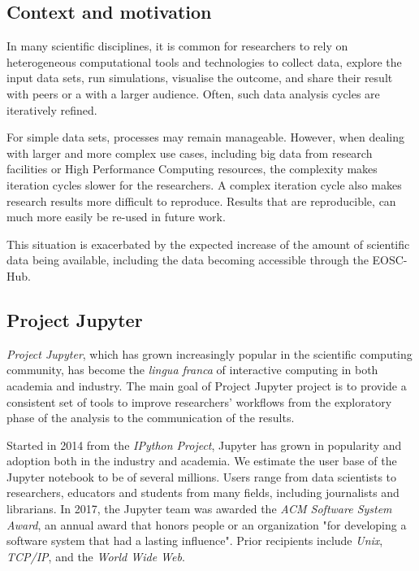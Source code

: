 \subsection{Context and motivation}

In many scientific disciplines, it is common for researchers to rely on
heterogeneous computational tools and technologies to collect data,
explore the input data sets, run simulations, visualise the outcome,
and share their result with peers or a with a larger audience. Often,
such data analysis cycles are iteratively refined.

For simple data sets, processes may remain manageable. However, when
dealing with larger and more complex use cases, including big data
from research facilities or High Performance Computing resources, the
complexity makes iteration cycles slower for the researchers. A
complex iteration cycle also makes research results more difficult to
reproduce. Results that are reproducible, can much more easily be
re-used in future work.

This situation is exacerbated by the expected increase of the amount
of scientific data being available, including the data becoming
accessible through the EOSC-Hub.


%

\subsection{Project Jupyter}

\emph{Project Jupyter}, which has grown increasingly popular in the scientific
computing community, has become the \emph{lingua franca} of interactive
computing in both academia and industry. The main goal of Project Jupyter
project is to provide a consistent set of tools to improve researchers'
workflows from the exploratory phase of the analysis to the communication
of the results.

Started in 2014 from the \emph{IPython Project}, Jupyter has grown in
popularity and adoption both in the industry and academia. We estimate the user
base of the Jupyter notebook to be of several millions. Users range from data
scientists to researchers, educators and students from many fields,
including journalists and librarians. In 2017, the Jupyter
team was awarded the \emph{ACM Software System Award}, an annual award that
honors people or an organization "for developing a software system that had a
lasting influence". Prior recipients include \emph{Unix}, \emph{TCP/IP}, and
the \emph{World Wide Web}.

